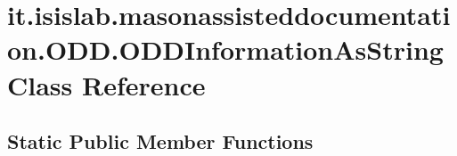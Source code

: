 \hypertarget{classit_1_1isislab_1_1masonassisteddocumentation_1_1_o_d_d_1_1_o_d_d_information_as_string}{\section{it.\-isislab.\-masonassisteddocumentation.\-O\-D\-D.\-O\-D\-D\-Information\-As\-String Class Reference}
\label{classit_1_1isislab_1_1masonassisteddocumentation_1_1_o_d_d_1_1_o_d_d_information_as_string}
}
\subsection*{Static Public Member Functions}
